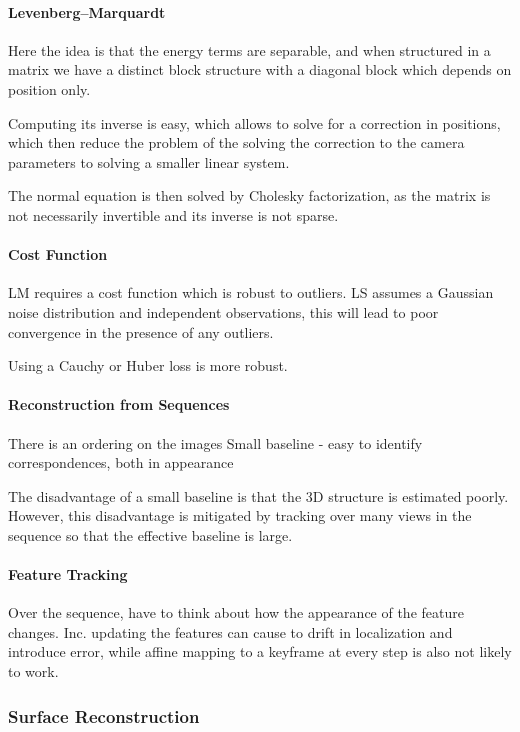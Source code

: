 \paragraph{Levenberg–Marquardt}

Here the idea is that the energy terms are separable, and when structured in a matrix we have a distinct block structure with a diagonal block which depends on position only. 

Computing its inverse is easy, which allows to solve for a correction in positions, which then reduce the problem of the solving the correction to the camera parameters to solving a smaller linear system.

The normal equation is then solved by Cholesky factorization, as the matrix is not necessarily invertible and its inverse is not sparse.

\paragraph{Cost Function}
LM requires a cost function which is robust to outliers. 
LS assumes a Gaussian noise distribution and independent observations, this will lead to poor convergence in the presence of any outliers. 

Using a Cauchy or Huber loss is more robust.

\paragraph{Reconstruction from Sequences}

There is an ordering on the images
Small baseline - easy to identify correspondences, both in appearance 

The disadvantage of a small baseline is that the 3D structure is estimated poorly. However, this disadvantage is mitigated by tracking over many views in the sequence so that the effective baseline is large.


\paragraph{Feature Tracking}

Over the sequence, have to think about how the appearance of the feature changes.
Inc. updating the features can cause to drift in localization and introduce error, while affine mapping to a keyframe at every step is also not likely to work.


\subsubsection{Surface Reconstruction}

